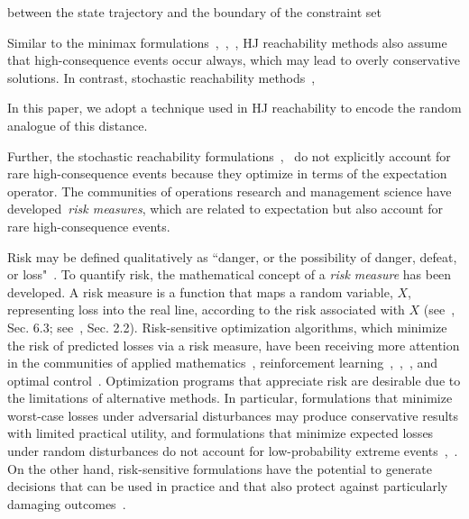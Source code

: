 \documentclass[letterpaper, 10 pt, conference]{ieeeconf}  %
\begin{document}
between the state trajectory and the boundary of the constraint set

Similar to the minimax formulations~\cite{bertsekas1971control},~\cite{bertsekas1971minimax},~\cite{bertsekas2005dynamic}, 
HJ reachability methods also assume that high-consequence events occur always, which may lead to overly conservative solutions.
In contrast, stochastic reachability methods~\cite{abate2008probabilistic},~\cite{summers2010verification}  
 
In this paper, we adopt a technique used in HJ reachability to encode the random analogue of this distance.


Further, the stochastic reachability formulations~\cite{abate2008probabilistic},~\cite{summers2010verification} 
do not explicitly account for rare high-consequence events because they optimize in terms of the expectation operator.
The communities of operations research and management science have developed~\textit{risk measures}, which are related to expectation 
but also account for rare high-consequence events. 



Risk may be defined qualitatively as ``danger, or the possibility of danger, defeat, or loss"~\cite{riskdef}.
To quantify risk, the mathematical concept of a \textit{risk measure} has been developed.
A risk measure is a function that maps a random variable, $X$, representing loss into the real line,
according to the risk associated with $X$ (see~\cite{shapiro2009lectures}, Sec. 6.3; see~\cite{kisiala2015conditional}, Sec. 2.2).
Risk-sensitive optimization algorithms, which minimize the risk of predicted losses via a risk measure,
have been receiving more attention in the communities of applied mathematics~\cite{ruszczynski2010risk}, reinforcement learning~\cite{osogami2012robustness},~\cite{chow2015risk},~\cite{ratliff2017risk}, and optimal control~\cite{chow2014framework}.
Optimization programs that appreciate risk are desirable due to the limitations of alternative methods.
In particular, formulations that minimize worst-case losses under adversarial disturbances
may produce conservative results with limited practical utility, and formulations that minimize expected losses under random disturbances do not account for low-probability extreme events~\cite{chow2014framework},~\cite{jha2018safe}. 
On the other hand, risk-sensitive formulations have the potential to generate decisions that can be used in practice and that also protect
against particularly damaging outcomes~\cite{serraino2013conditional}.
\end{document}

